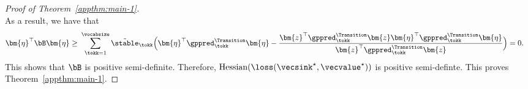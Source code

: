 \begin{proof}[Proof of Theorem~\ref{appthm:main-1}]
\[\]
As a result, we have that
\begin{align*}
\bm{\eta}^\top \bB \bm{\eta} \geq &~ \sum_{\tokk=1}^\vocabsize  \Tilde{\stable}_\tokk \Big(\bm{\eta}^\top\gppred^\Transition_\tokk\bm{\eta} - \frac{\bm{z}^\top \gppred_\tokk^\Transition \bm{z} \bm{\eta}^\top \gppred_\tokk^\Transition \bm{\eta}}{\bm{z}^\top \gppred_\tokk^\Transition \bm{z}}\Big) = 0.
\end{align*}
This shows that $\bB$ is positive semi-definite. Therefore, $\text{Hessian}(\loss(\vecsink^\star, \vecvalue^\star))$ is positive semi-definte.  This proves Theorem~\ref{appthm:main-1}.
\end{proof}

